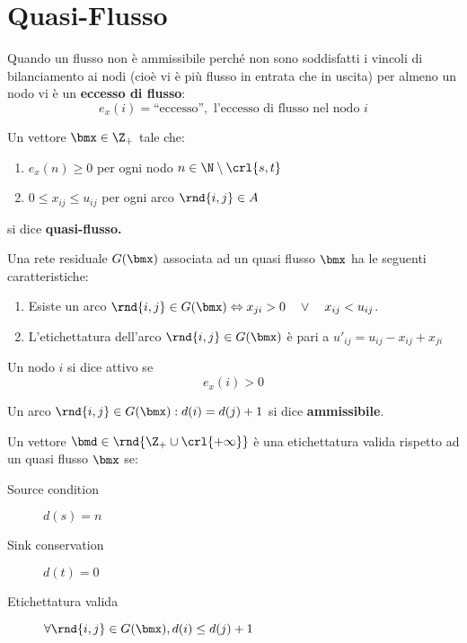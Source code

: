 \documentclass[\main/main.tex]{subfiles}
\begin{document}
\section{Quasi-Flusso}
\begin{definition}
  Quando un flusso non è ammissibile perché non sono soddisfatti i vincoli di bilanciamento ai nodi (cioè vi è più flusso in entrata che in uscita) per almeno un nodo vi è un \textbf{eccesso di flusso}:
  \[
    e_x(i)=\text{``eccesso''}, \text{ l'eccesso di flusso nel nodo \(i\)}
  \]
\end{definition}
\begin{definition}
  Un vettore \(\bmx \in \Z_+\) tale che:
  \begin{enumerate}
    \item \(e_x(n) \geq 0\) per ogni nodo \(n \in \N \setminus \crl{s,t}\)
    \item \(0 \leq x_{ij} \leq u_{ij}\) per ogni arco \(\rnd{i,j} \in A\)
  \end{enumerate}
  si dice \textbf{quasi-flusso.}
\end{definition}
\clearpage
\begin{definition}
  Una rete residuale \(G(\bmx)\) associata ad un quasi flusso \(\bmx\) ha le seguenti caratteristiche:
  \begin{enumerate}
    \item Esiste un arco \(\rnd{i,j} \in G(\bmx) \Leftrightarrow x_{ji} > 0 \quad \lor \quad x_{ij} < u_{ij}\).
    \item L'etichettatura dell'arco \(\rnd{i,j} \in G(\bmx)\) è pari a \(u'_{ij} = u_{ij} - x_{ij} + x_{ji}\)
  \end{enumerate}
\end{definition}

\begin{definition}
  Un nodo \(i\) si dice attivo se \[e_x(i) > 0\]
\end{definition}
\begin{definition}
  Un arco \(\rnd{i,j} \in G(\bmx):  d(i) = d(j) +1\) si dice \textbf{ammissibile}.
\end{definition}
\begin{definition}
  Un vettore \(\bmd \in \rnd{\Z_+ \cup \crl{+\infty}}\) è una etichettatura valida rispetto ad un quasi flusso \(\bmx\) se:
  \begin{description}
    \item[Source condition] \(d(s) = n\)
    \item[Sink conservation] \(d(t) = 0\)
    \item[Etichettatura valida]\(\forall \rnd{i,j} \in G(\bmx), d(i) \leq d(j) +1\)
  \end{description}
\end{definition}
\end{document}
